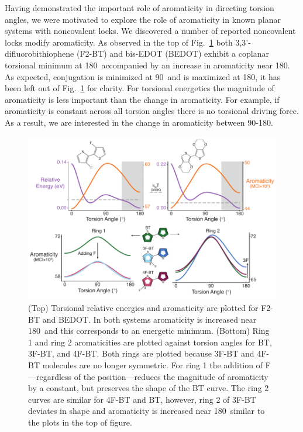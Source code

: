 Having demonstrated the important role of aromaticity in directing torsion angles, we were motivated to explore the role of aromaticity in known planar systems with noncovalent locks. We discovered a number of reported noncovalent locks modify aromaticity. As observed in the top of Fig.~\ref{fig:a_mod} both  3,3'-difluorobithiophene (F2-BT) and bis-EDOT (BEDOT) exhibit a coplanar torsional minimum at 180\textdegree \ accompanied by an increase in aromaticity near 180\textdegree. As expected, conjugation is minimized at 90\textdegree \ and is maximized at 180\textdegree, it has been left out of Fig.~\ref{fig:a_mod} for clarity. For torsional energetics the magnitude of aromaticity is less important than the change in aromaticity. For example, if aromaticity is constant across all torsion angles there is no torsional driving force. As a result, we are interested in the change in aromaticity between 90-180\textdegree.

\begin{figure}[hbt!]
    \centering
    \includegraphics{figures/chap3/fig2_d7.pdf}
    \caption{(Top) Torsional relative energies and aromaticity are plotted for F2-BT and BEDOT. In both systems aromaticity is increased near 180\textdegree \ and this corresponds to an energetic minimum. (Bottom) Ring 1 and ring 2 aromaticities are plotted against torsion angles for BT, 3F-BT, and 4F-BT. Both rings are plotted because 3F-BT and 4F-BT molecules are no longer symmetric. For ring 1 the addition of F---regardless of the position---reduces the magnitude of aromaticity by a constant, but preserves the shape of the BT curve. The ring 2 curves are similar for 4F-BT and BT, however, ring 2 of 3F-BT deviates in shape and aromaticity is increased near 180\textdegree \ similar to the plots in the top of figure.}
    \label{fig:a_mod}
\end{figure}


